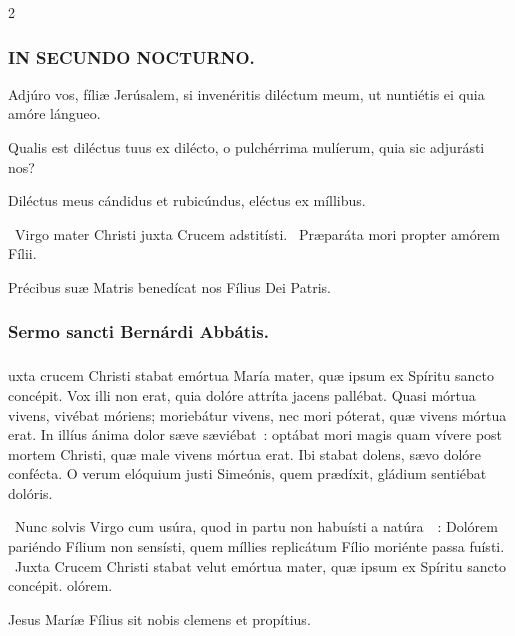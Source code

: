 \documentclass[9pt,twoside]{extarticle}
\begin{document}
\begin{multicols}{2}
{\subsubsection*{\center \textsc{IN SECUNDO NOCTURNO.}}
\begin{tightlist}{}
\item {} Adjúro vos, fíliæ Jerúsalem, si invenéritis diléctum meum, ut nuntiétis ei quia amóre lángueo.
\item {} Qualis est diléctus tuus ex dilécto, o pulchérrima mulíerum, quia sic adjurásti nos?
\item {} Diléctus meus cándidus et rubicúndus, eléctus ex míllibus.
\item {}~Virgo mater Christi juxta Crucem adstitísti. ~Præparáta mori propter amórem Fílii.
\item {\small {} Précibus suæ Matris benedícat nos Fílius Dei Patris.}
\end{tightlist}

\subsubsection*{\center Sermo sancti Bernárdi Abbátis.}
\subsubsection*{\center {}}
uxta crucem Christi stabat emórtua María mater, quæ ipsum ex Spíritu sancto concépit. Vox illi non erat, quia dolóre attríta jacens pallébat. Quasi mórtua vivens, vivébat móriens; moriebátur vivens, nec mori póterat, quæ vivens mórtua erat. In illíus ánima dolor sæve sæviébat~: optábat mori magis quam vívere post mortem Christi, quæ male vivens mórtua erat. Ibi stabat dolens, sævo dolóre confécta. O verum elóquium justi Simeónis, quem prædíxit, gládium sentiébat dolóris.

\begin{tightlist}{}
\item {}~Nunc solvis Virgo cum usúra, quod in partu non habuísti a natúra~~: \textred{*} Dolórem pariéndo Fílium non sensísti, quem míllies replicátum Fílio moriénte passa fuísti. ~Juxta Crucem Christi stabat velut emórtua mater, quæ ipsum ex Spíritu sancto concépit. olórem.
\item {\small {} Jesus Maríæ Fílius sit nobis clemens et propítius.}
\end{tightlist}

}
\end{multicols}
\end{document}
